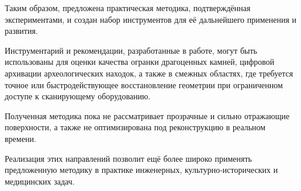Таким образом, предложена практическая методика, подтверждённая экспериментами,
и создан набор инструментов для её дальнейшего применения и развития.

Инструментарий и рекомендации, разработанные в работе, могут быть использованы
для оценки качества огранки драгоценных камней, цифровой архивации
археологических находок, а также в смежных областях, где требуется точное или
быстродействующее восстановление геометрии при ограниченном доступе
к сканирующему оборудованию.

Полученная методика пока не рассматривает прозрачные и сильно отражающие
поверхности, а также не оптимизирована под реконструкцию в реальном времени.

Реализация этих направлений позволит ещё более широко применять предложенную
методику в практике инженерных, культурно‑исторических и медицинских задач.

